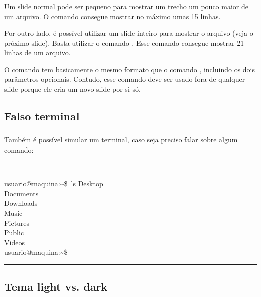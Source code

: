 \documentclass[aspectratio=169]{beamer}
\begin{document}
\begin{frame}[t]\frametitle{\secname}\framesubtitle{\subsecname}
  Um slide normal pode ser pequeno para mostrar um trecho um pouco maior de um arquivo.
  O comando  consegue mostrar no máximo umas 15 linhas.

  Por outro lado, é possível utilizar um slide inteiro para mostrar o arquivo (veja o próximo slide).
  Basta utilizar o comando .
  Esse comando consegue mostrar 21 linhas de um arquivo.

  O comando  tem basicamente o mesmo formato que o comando , incluindo os dois parâmetros opcionais.
  Contudo, esse comando deve ser usado fora de qualquer slide porque ele cria um novo slide por si só.
\end{frame}


\subsection{Falso terminal}

\begin{frame}[t]\frametitle{\secname}\framesubtitle{\subsecname}
  Também é possível simular um terminal, caso seja preciso falar sobre algum comando:

  ~
  \def\prompt{\color{codekeyword}usuario@maquina:{\textasciitilde}\$\color{codefg}~}
  \begin{terminal}[title={Bash}]
  \prompt ls
  Desktop\\Documents\\Downloads\\Music\\Pictures\\Public\\Videos\\
  \prompt \rule{1ex}{1em}
  \end{terminal}
\end{frame}

\subsection{Tema light vs. dark}
\end{document}
